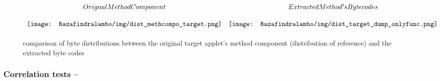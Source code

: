 \begin{figure}[!h]
\begin{center}
\[\arraycolsep=5pt\def\arraystretch{2.1}
\begin{array}{cc}
Orignal Method Component & Extracted Method's Byte codes  \\    
\texttt{[image: Razafindralambo/img/dist\_methcompo\_target.png]} &
\texttt{[image: Razafindralambo/img/dist\_target\_dump\_onlyfunc.png]} 
\end{array}
\]
\caption{comparison of byte distributions between the original target applet's method component
    (distribution of reference) and the extracted byte codes}
\label{fig:bd2}
\end{center}
\end{figure}


\vspace{-1em}
\subsubsection{Correlation tests --}

